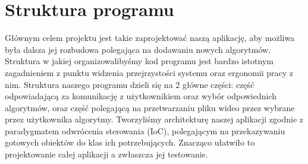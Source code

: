 \documentclass[twoside]{projektInzynierskiMS}
\begin{document}
\section{Struktura programu}

Głównym celem projektu jest takie zaprojektować naszą aplikację, aby możliwa była dalsza jej rozbudowa polegająca na dodawaniu nowych algorytmów. Struktura w jakiej organizowalibyśmy kod programu jest bardzo istotnym zagadnieniem z punktu widzenia przejrzystości systemu oraz ergonomii pracy z nim. Struktura naszego programu dzieli się na 2 główne części: część odpowiadającą za komunikację z użytkownikiem oraz wybór odpowiednich algorytmów, oraz część polegającą na przetwarzaniu pliku wideo przez wybrane przez użytkownika algorytmy. Tworzyliśmy architekturę naszej aplikacji zgodnie z paradygmatem odwrócenia sterowania (IoC), polegającym na przekazywaniu gotowych obiektów do klas ich potrzebujących. Znacząco ułatwiło to projektowanie całej aplikacji a zwłaszcza jej testowanie.
\end{document}
